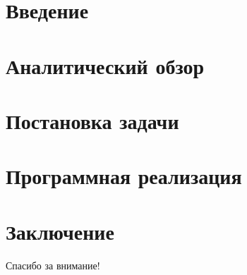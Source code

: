 \documentclass[9pt]{beamer}
\begin{document}

\section{Введение}

\section{Аналитический обзор}

\section{Постановка задачи}

\section{Программная реализация}

\section*{Заключение}

\def\secname{}

\begin{frame}

    \begin{center}
        \LARGE
        Спасибо за внимание!
    \end{center}

\end{frame}
\end{document}
